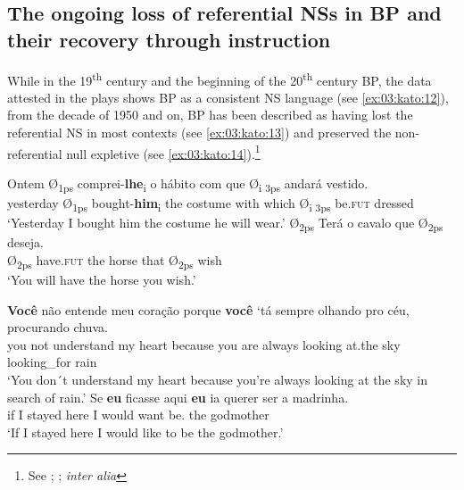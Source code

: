 \documentclass[output=paper,colorlinks,citecolor=brown]{langscibook}
\begin{document}
\subsection{The ongoing loss of referential NSs in BP and their recovery through instruction}
While in the 19\textsuperscript{th} century and the beginning of the 20\textsuperscript{th} century BP, the data attested in the plays shows BP as a consistent NS language (see \ref{ex:03:kato:12}), from the decade of 1950 and on, BP has been described as having lost the referential NS in most contexts (see \ref{ex:03:kato:13}) and preserved the non-referential null expletive (see \ref{ex:03:kato:14}).\footnote{See \citet{duarte1995}; \citet{figueiredo_silva_posicao_1996}; \citet{modesto_null_2000} \emph{inter alia}}

\ea\label{ex:03:kato:12} %
   \ea\label{ex:03:kato:12a}\gll Ontem       Ø\textsubscript{1ps} comprei-\textbf{lhe}\textsubscript{i}  o   hábito       com que     Ø\textsubscript{i 3ps}  andará vestido.\\
            yesterday   Ø\textsubscript{1ps} bought-\textbf{him}\textsubscript{i}  the costume   with which Ø\textsubscript{i 3ps} be.\textsc{fut} dressed			 \\ 
           \glt ‘Yesterday I bought him the costume he will wear.’ 
   \ex\label{ex:03:kato:12b}
 \gll  Ø\textsubscript{2ps}  Terá          o   cavalo  que Ø\textsubscript{2ps} deseja.	\\
             Ø\textsubscript{2ps} have.\textsc{fut} the horse    that Ø\textsubscript{2ps} wish \\ 
            \glt ‘You will have the horse you wish.’ 
   \z
\z

\ea\label{ex:03:kato:13} %
   \ea\label{ex:03:kato:13a}
 \gll \textbf{Você} não  entende      meu coração porque \textbf{você} ‘tá sempre olhando pro      céu, procurando chuva. \\
            you  not  understand  my heart       because you  are always looking  at.the  sky looking\_for rain \\
            \glt ‘You don´t understand my heart because you're always looking at the sky in search of rain.’
   \ex\label{ex:03:kato:13b}
 \gll  Se \textbf{eu}   ficasse aqui \textbf{eu} ia          querer ser      a    madrinha. \\
             if  I     stayed  here  I   would   want   be.   the godmother \\ 
            \glt ‘If I stayed here I would like to be the godmother.’ 
\end{document}
